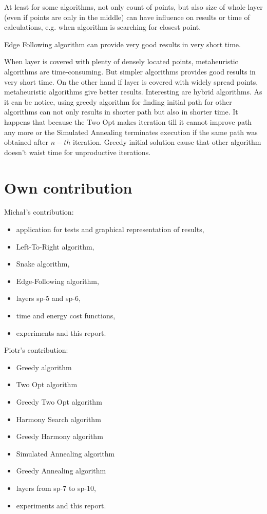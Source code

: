 \documentclass[titlepage]{article}
\begin{document}
At least for some algorithms, not only count of points, but also size of whole layer (even if points are only in the middle) can have influence on results or time of calculations, e.g. when algorithm is searching for closest point.

Edge Following algorithm can provide very good results in very short time.

When layer is covered with plenty of densely located points, metaheuristic algorithms are time-consuming. But simpler  algorithms provides good results in very short time. On the other hand if layer is covered with widely spread points, metaheuristic algorithms give better results. Interesting are hybrid algorithms. As it can be notice, using greedy algorithm for finding initial path for other algorithms can not only results in shorter path but also in shorter time. It happens that because the Two Opt makes iteration till it cannot improve path any more or the Simulated Annealing terminates execution if the same path was obtained after $n-th$ iteration. Greedy initial solution cause that other algorithm doesn't waist time for unproductive iterations.

\section{Own contribution}
Michał's contribution:
\begin{itemize}
\item application for tests and graphical representation of results,
\item Left-To-Right algorithm,
\item Snake algorithm,
\item Edge-Following algorithm,
\item layers sp-5 and sp-6,
\item time and energy cost functions,
\item experiments and this report.
\end{itemize}
Piotr's contribution:
\begin{itemize}
\item Greedy algorithm
\item Two Opt algorithm
\item Greedy Two Opt algorithm
\item Harmony Search algorithm
\item Greedy Harmony algorithm
\item Simulated Annealing algorithm
\item Greedy Annealing algorithm
\item layers from sp-7 to sp-10,
\item experiments and this report. 
\end{itemize}

\nocite{*}



\newpage



\newpage

\listoffigures

\newpage
\listoftables
\end{document}

